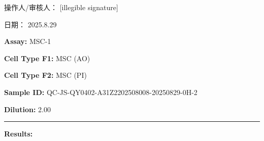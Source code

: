 \documentclass[UTF8,10pt,a4paper,fontset=fandol]{ctexart}
\newcommand{\fieldvalue}[1]{#1}
\newcommand{\handwritten}[1]{#1}
\begin{document}
\vspace{1em}

操作人/审核人：%
\fieldvalue{\handwritten{[illegible signature]}}

\hfill

日期：%
\fieldvalue{\handwritten{2025.8.29}}

\newpage

\noindent
\textbf{Assay:}
\fieldvalue{MSC-1}

\vspace{0.8em}

\noindent
\textbf{Cell Type F1:}
\fieldvalue{MSC (AO)}

\noindent
\textbf{Cell Type F2:}
\fieldvalue{MSC (PI)}

\vspace{0.8em}

\noindent
\textbf{Sample ID:}
\fieldvalue{QC-JS-QY0402-A31Z2202508008-20250829-0H-2}

\noindent
\textbf{Dilution:}
\fieldvalue{2.00}

\vspace{0.8em}
\hrule
\vspace{0.4em}

\noindent
\textbf{Results:}

\vspace{0.5em}
\end{document}
